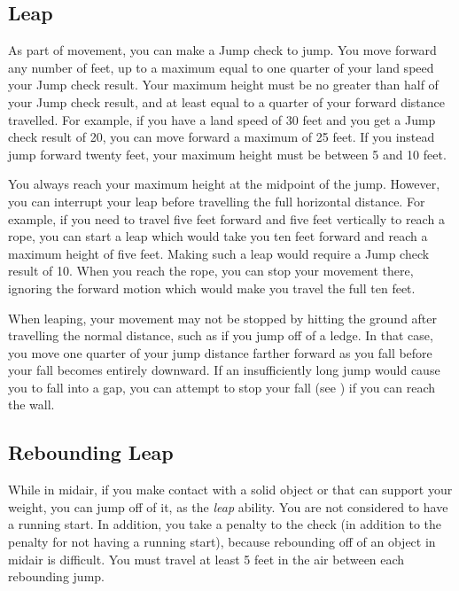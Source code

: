     \subsection{Leap}\label{Leap}
        As part of movement, you can make a Jump check to jump.
        You move forward any number of feet, up to a maximum equal to one quarter of your land speed \add your Jump check result.
        Your maximum height must be no greater than half of your Jump check result, and at least equal to a quarter of your forward distance travelled.
        For example, if you have a land speed of 30 feet and you get a Jump check result of 20, you can move forward a maximum of 25 feet.
        If you instead jump forward twenty feet, your maximum height must be between 5 and 10 feet.

        You always reach your maximum height at the midpoint of the jump.
        However, you can interrupt your leap before travelling the full horizontal distance.
        For example, if you need to travel five feet forward and five feet vertically to reach a rope, you can start a leap which would take you ten feet forward and reach a maximum height of five feet.
        Making such a leap would require a Jump check result of 10.
        When you reach the rope, you can stop your movement there, ignoring the forward motion which would make you travel the full ten feet.

        When leaping, your movement may not be stopped by hitting the ground after travelling the normal distance, such as if you jump off of a ledge.
        In that case, you move one quarter of your jump distance farther forward as you fall before your fall becomes entirely downward.
        If an insufficiently long jump would cause you to fall into a gap, you can attempt to stop your fall (see ) if you can reach the wall.

    \subsection{Rebounding Leap}\label{Rebounding Leap}
        While in midair, if you make contact with a solid object or  that can support your weight, you can jump off of it, as the \textit{leap} ability.
        You are not considered to have a running start.
        In addition, you take a  penalty to the check (in addition to the penalty for not having a running start), because rebounding off of an object in midair is difficult.
        You must travel at least 5 feet in the air between each rebounding jump.

